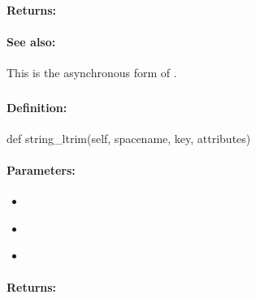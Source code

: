 \paragraph{Returns:}


\paragraph{See also:}  This is the asynchronous form of .

\pagebreak
\subsubsection{}
\label{api:python:string_ltrim}


\paragraph{Definition:}
\begin{pythoncode}
def string_ltrim(self, spacename, key, attributes)
\end{pythoncode}

\paragraph{Parameters:}
\begin{itemize}[noitemsep]
\item {}\\

\item {}\\

\item {}\\

\end{itemize}

\paragraph{Returns:}


\pagebreak
\subsubsection{}
\label{api:python:async_string_ltrim}


